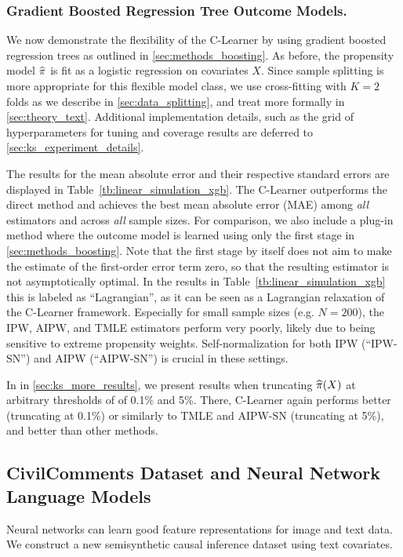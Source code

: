 


\subsubsection{Gradient Boosted Regression Tree Outcome Models.}
\label{sec:ks_xgb}
We now demonstrate the flexibility of the C-Learner by using gradient boosted regression trees as outlined in \cref{sec:methods_boosting}. As before, the propensity model $\widehat{\pi}$ is fit as a logistic regression on covariates $X$.  
Since sample splitting is more appropriate for this flexible model class, we use cross-fitting with $K=2$ folds as 
we describe in 
\cref{sec:data_splitting}, and treat more formally in \cref{sec:theory_text}.  Additional implementation details, such as the grid of hyperparameters for tuning and coverage results are deferred to \cref{sec:ks_experiment_details}. 

The results for the mean absolute error and their respective standard errors are displayed in Table~\ref{tb:linear_simulation_xgb}. The C-Learner outperforms the direct method and achieves the best mean absolute error (MAE) among \emph{all} estimators and across \emph{all} sample sizes. For comparison, we also include
a plug-in method where the outcome model is learned using only the first stage in 
\cref{sec:methods_boosting}. 
Note that the first stage by itself does not aim to make the estimate of the first-order error term zero, so that the resulting estimator is not asymptotically optimal. 
In the results in Table~\ref{tb:linear_simulation_xgb} this is labeled as ``Lagrangian'', as it can be seen as a Lagrangian relaxation of the C-Learner framework. Especially for small sample sizes (e.g. $N=200$), the IPW, AIPW, and TMLE estimators perform very poorly, likely due to being sensitive to extreme propensity weights. 
Self-normalization for both IPW (``IPW-SN'') and AIPW (``AIPW-SN'') is crucial in these settings. 

 In  in \cref{sec:ks_more_results}, we present results when truncating $\widehat{\pi}(X)$ at arbitrary thresholds of of 0.1\% and 5\%. There, C-Learner again performs better (truncating at 0.1\%) or similarly to TMLE and AIPW-SN (truncating at 5\%), and better than other methods.




\subsection{CivilComments Dataset and Neural Network Language Models}\label{sec:civilcomments}
Neural networks can learn good feature representations for image and text data. 
We construct a new semisynthetic causal inference dataset using text covariates. 


